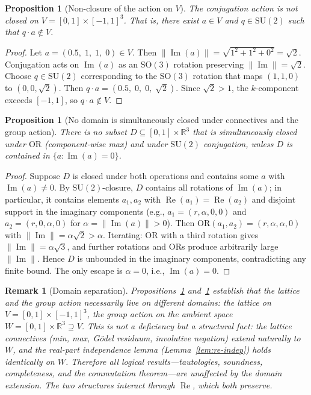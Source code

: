 \documentclass[11pt,a4paper]{article}
\newtheorem{proposition}[theorem]{Proposition}
\newtheorem{remark}[theorem]{Remark}
\newcommand{\recu}[1]{{\color{kcolor}#1}}
\newcommand{\Real}{\operatorname{Re}}
\newcommand{\Imag}{\operatorname{Im}}
\newcommand{\SU}{\mathrm{SU}(2)}
\def\recu#1{#1}%
\begin{document}
\begin{proposition}[Non-closure of the action on $V$]
\label{prop:nonclosure}
The conjugation action is not closed on $V=[0,1]\times[-1,1]^3$.
That is, there exist $a\in V$ and $q\in\SU$ such that
$q\cdot a\notin V$.
\end{proposition}

\begin{proof}
Let $a=(0.5,\;1,\;1,\;0)\in V$. Then
$\|\Imag(a)\|=\sqrt{1^2+1^2+0^2}=\sqrt{2}$.
Conjugation acts on $\Imag(a)$ as an $\mathrm{SO}(3)$ rotation
preserving $\|\Imag\|=\sqrt{2}$. Choose $q\in\SU$ corresponding
to the $\mathrm{SO}(3)$ rotation that maps $(1,1,0)$ to
$(0,0,\sqrt{2})$. Then $q\cdot a=(0.5,\;0,\;0,\;\sqrt{2})$.
Since $\sqrt{2}>1$, the $\recu{k}$-component exceeds $[-1,1]$,
so $q\cdot a\notin V$.
\end{proof}

\begin{proposition}[No domain is simultaneously closed under
connectives and the group action]
\label{prop:no_joint_domain}
There is no subset $D\subseteq[0,1]\times\mathbb{R}^3$ that is
simultaneously closed under $\mathrm{OR}$ (component-wise max)
and under $\SU$ conjugation, unless $D$ is contained in
$\{a:\Imag(a)=0\}$.
\end{proposition}

\begin{proof}
Suppose $D$ is closed under both operations and contains some
$a$ with $\Imag(a)\neq0$. By $\SU$-closure, $D$ contains all
rotations of $\Imag(a)$; in particular, it contains elements
$a_1,a_2$ with $\Real(a_1)=\Real(a_2)$ and disjoint support in
the imaginary components (e.g., $a_1=(r,\alpha,0,0)$ and
$a_2=(r,0,\alpha,0)$ for $\alpha=\|\Imag(a)\|>0$). Then
$\mathrm{OR}(a_1,a_2)=(r,\alpha,\alpha,0)$ with
$\|\Imag\|=\alpha\sqrt{2}>\alpha$. Iterating: $\mathrm{OR}$
with a third rotation gives $\|\Imag\|=\alpha\sqrt{3}$, and
further rotations and ORs produce arbitrarily large
$\|\Imag\|$. Hence $D$ is unbounded in the imaginary
components, contradicting any finite bound. The only escape is
$\alpha=0$, i.e., $\Imag(a)=0$.
\end{proof}

\begin{remark}[Domain separation]
\label{rem:domain}
Propositions~\ref{prop:nonclosure} and~\ref{prop:no_joint_domain}
establish that the lattice and the group action necessarily live on
different domains: the lattice on $V=[0,1]\times[-1,1]^3$, the
group action on the ambient space
$W=[0,1]\times\mathbb{R}^3\supseteq V$. This is not a deficiency
but a structural fact: the lattice connectives (min, max, G\"odel
residuum, involutive negation) extend naturally to $W$, and the
real-part independence lemma (Lemma~\ref{lem:re-indep}) holds
identically on $W$. Therefore all logical results---tautologies,
soundness, completeness, and the commutation theorem---are
unaffected by the domain extension. The two structures interact
through $\Real$, which both preserve.
\end{remark}
\end{document}

